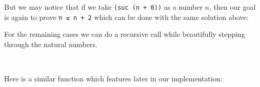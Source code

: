 {But we may notice that if we take \texttt{(suc (n + 0))} as a number $n$, then our goal is again to prove \texttt{n ≤ n + 2} which can be done with the same solution above:

\begin{code}%
\>[0]\AgdaSpace{}%
\AgdaSpace{}%
\AgdaSymbol{(}\AgdaSpace{}%
\AgdaSymbol{)}\AgdaSpace{}%
\AgdaSymbol{=}\AgdaSpace{}%
\AgdaSpace{}%
\AgdaSymbol{(}\AgdaSpace{}%
\AgdaSymbol{)}\<%
\end{code}

For the remaining cases we can do a recursive call while beautifully stepping through the natural numbers.

\begin{code}%
\>[0]\AgdaSpace{}%
\AgdaSymbol{(}\AgdaSpace{}%
\AgdaSymbol{)}\AgdaSpace{}%
\AgdaSpace{}%
\AgdaSymbol{=}\AgdaSpace{}%
\AgdaSpace{}%
\AgdaSymbol{(}\AgdaSpace{}%
\AgdaSpace{}%
\AgdaSymbol{)}\<%
\\
\>[0]\AgdaSpace{}%
\AgdaSymbol{(}\AgdaSpace{}%
\AgdaSymbol{)}\AgdaSpace{}%
\AgdaSymbol{(}\AgdaSpace{}%
\AgdaSymbol{)}\AgdaSpace{}%
\AgdaSymbol{=}\AgdaSpace{}%
\AgdaSpace{}%
\AgdaSymbol{(}\AgdaSpace{}%
\AgdaSpace{}%
\AgdaSymbol{(}\AgdaSpace{}%
\AgdaSymbol{))}\<%
\end{code}

Here is a similar function which features later in our implementation:

}
